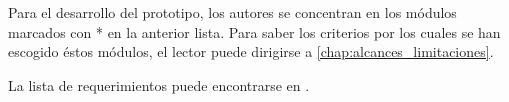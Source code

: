 Para el desarrollo del prototipo, los autores se concentran en los módulos marcados con * en la anterior lista. Para saber los criterios por los cuales se han escogido éstos módulos, el lector puede dirigirse a \ref{chap:alcances_limitaciones}.

La lista de requerimientos puede encontrarse en \cite{anexos_tesis}.